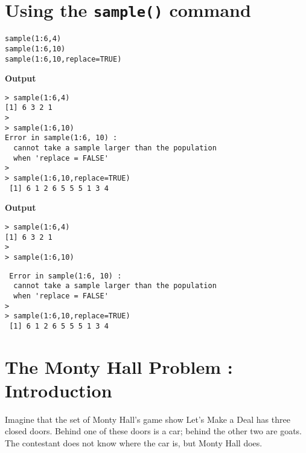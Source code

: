 \documentclass[12pt,a4paper]{article}
\begin{document}
\newpage
\section{Using the \texttt{sample()} command}
\large
\begin{framed}
\begin{verbatim}
sample(1:6,4)
sample(1:6,10)
sample(1:6,10,replace=TRUE)
\end{verbatim}
\end{framed}
\begin{shaded}
\begin{framed}
\textbf{Output}
\large{\color{BrickRed}
\begin{verbatim}
> sample(1:6,4)
[1] 6 3 2 1
>
> sample(1:6,10)
Error in sample(1:6, 10) :
  cannot take a sample larger than the population 
  when 'replace = FALSE'
>
> sample(1:6,10,replace=TRUE)
 [1] 6 1 2 6 5 5 5 1 3 4
\end{verbatim}}
\end{framed}
\end{shaded}

\newpage
\begin{shaded}
\begin{framed}
\textbf{Output}
\large{\color{BrickRed}
\begin{verbatim}
> sample(1:6,4)
[1] 6 3 2 1
>
> sample(1:6,10)
\end{verbatim}
}
\end{framed}
\vspace{-1.83cm}
\begin{framed}
\large{\color{BrickRed}
\begin{verbatim} Error in sample(1:6, 10) :
  cannot take a sample larger than the population 
  when 'replace = FALSE'
>
> sample(1:6,10,replace=TRUE)
 [1] 6 1 2 6 5 5 5 1 3 4
\end{verbatim}
}
\end{framed}
\end{shaded}
\newpage
\section{The Monty Hall Problem : Introduction}
Imagine that the set of Monty Hall's game show Let's Make a Deal has three closed doors. Behind one of these doors is a car; behind the other two are goats. The contestant does not know where the car is, but Monty Hall does.
\end{document}
